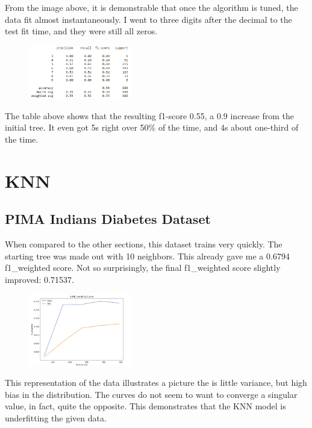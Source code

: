 \documentclass[conference]{IEEEtran}
\begin{document}
From the image above, it is demonstrable that once the algorithm is tuned, the data fit almost instantaneously. I went to three digits after the decimal to the test fit time, and they were still all zeros.

\begin{figure}[H]
    \centering
    \includegraphics[width=0.40\textwidth]{Red Wine Quality Graph Images/Decision Trees/dtc cm.png}
    \label{fig:enter-label}
\end{figure}

The table above shows that the resulting f1-score 0.55, a 0.9 increase from the initial tree. It even got 5s right over 50\% of the time, and 4s about one-third of the time. 

\section{KNN}

\subsection{\textbf{PIMA Indians Diabetes Dataset}}\label{AA}
When compared to the other sections, this dataset trains very quickly. The starting tree was made out with 10 neighbors. This already gave me a 0.6794 f1\_weighted score. Not so surprisingly, the final f1\_weighted score slightly improved: 0.71537. 

\begin{figure}[H]
    \centering
    \includegraphics[width=0.40\textwidth]{PIMA Indian Diabetes Graphs/KNN/knn init lc.png}
    \label{fig:enter-label}
\end{figure}

This representation of the data illustrates a picture the is little variance, but high bias in the distribution. The curves do not seem to want to converge a singular value, in fact, quite the opposite. 
This demonstrates that the KNN model is underfitting the given data.
\end{document}
